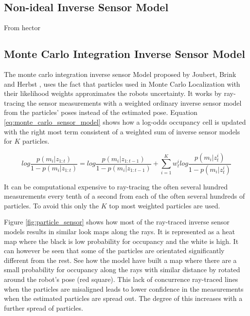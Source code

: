 \subsection{Non-ideal Inverse Sensor Model}
From hector

\subsection{Monte Carlo Integration Inverse Sensor Model}
\label{monte_carlo_sensor Model}
The monte carlo integration inverse sensor Model proposed by Joubert, Brink and Herbst \cite{Joubert2014},  uses the fact that particles used in Monte Carlo Localization with their likelihood weights approximates the robots uncertainty. 
It works by ray-tracing the sensor measurements with a weighted ordinary inverse sensor model from the particles' poses instead of the estimated pose. 
Equation \ref{eq:monte_carlo_sensor_model} shows how a log-odds occupancy cell is updated with the right most term consistent of a weighted sum of inverse sensor models for $K$ particles.

\begin{equation}
log \frac{p(m_i|z_{1:t})}{1-p(m_i|z_{1:t})} = log \frac{p(m_i|z_{1:t-1})}{1-p(m_i|z_{1:t-1})} + \sum_{i=1}^{K} w_t^i log \frac{ p(m_i | z_t^i) }{ 1 - p(m_i | z_t^i) }
\label{eq:monte_carlo_sensor_model}
\end{equation}

It can be computational expensive to ray-tracing the often several hundred measurements every tenth of a second from each of the often several hundreds of particles.
To avoid this only the $K$ top most weighted particles are used.%

Figure \ref{fig:particle_sensor} shows how most of the ray-traced inverse sensor models results in similar look maps along the rays. 
It is represented as a heat map where the black is low probability for occupancy and the white is high. 
It can however be seen that some of the particles are orientated significantly different from the rest. 
See how the model have built a map where there are a small probability for occupancy along the rays with similar distance by rotated around the robot's pose (red square). This lack of concurrence ray-traced lines when the particles are misaligned leads to lower confidence in the measurements when the estimated particles are spread out. The degree of this increases with a further spread of particles.

